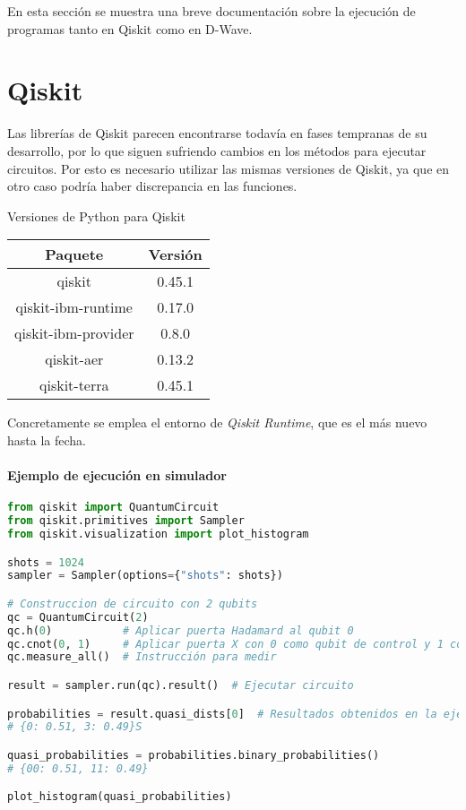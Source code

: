 En esta sección se muestra una breve documentación sobre la ejecución de programas tanto en Qiskit como en D-Wave.

\section{Qiskit}

Las librerías de Qiskit parecen encontrarse todavía en fases tempranas de su desarrollo, por lo que siguen sufriendo cambios en los métodos para ejecutar circuitos.
Por esto es necesario utilizar las mismas versiones de Qiskit, ya que en otro caso podría haber discrepancia en las funciones.

\begin{table}{}{Versiones de Python para Qiskit}
  \centering
  \begin{tabular}{|c|c|}
    \hline
    \textbf{Paquete}    & \textbf{Versión} \\ \hline
    qiskit              & 0.45.1           \\
    qiskit-ibm-runtime  & 0.17.0           \\
    qiskit-ibm-provider & 0.8.0            \\
    qiskit-aer          & 0.13.2           \\
    qiskit-terra        & 0.45.1           \\
    \hline
  \end{tabular}
\end{table}

Concretamente se emplea el entorno de \textit{Qiskit Runtime}, que es el más nuevo hasta la fecha.

\paragraph{Ejemplo de ejecución en simulador}

\begin{lstlisting}[language=Python,label=cod:8-ejecucion_qiskit_simulador,caption={Ejemplo de ejecución en simulador de Qiskit},style=numbered]
from qiskit import QuantumCircuit
from qiskit.primitives import Sampler
from qiskit.visualization import plot_histogram

shots = 1024
sampler = Sampler(options={"shots": shots})

# Construccion de circuito con 2 qubits
qc = QuantumCircuit(2)
qc.h(0)           # Aplicar puerta Hadamard al qubit 0
qc.cnot(0, 1)     # Aplicar puerta X con 0 como qubit de control y 1 como objetivo
qc.measure_all()  # Instrucción para medir

result = sampler.run(qc).result()  # Ejecutar circuito

probabilities = result.quasi_dists[0]  # Resultados obtenidos en la ejecución
# {0: 0.51, 3: 0.49}S

quasi_probabilities = probabilities.binary_probabilities()
# {00: 0.51, 11: 0.49}

plot_histogram(quasi_probabilities)
\end{lstlisting}

